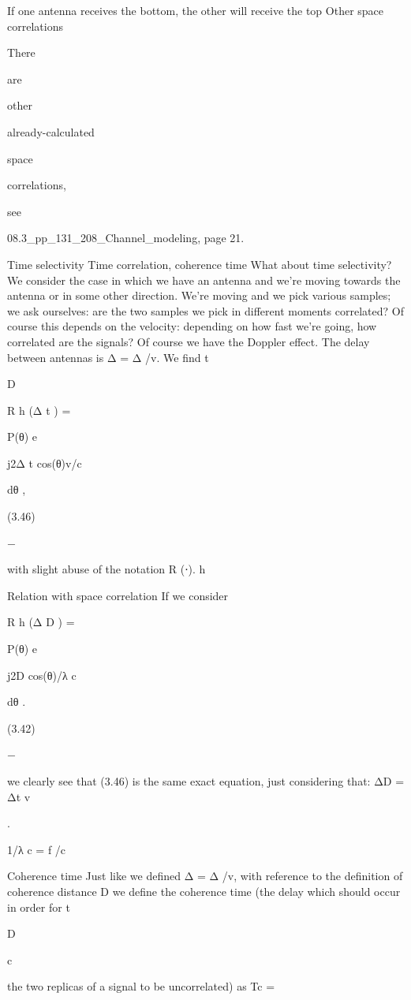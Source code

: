 {{{{If one antenna receives the bottom, the other will receive the top Other space correlations

There

are

other

already-calculated

space

correlations,

see

08.3_pp_131_208_Channel_modeling, page 21.

Time selectivity Time correlation, coherence time What about time selectivity? We consider the case in which we have an antenna and we're moving towards the antenna or in some other direction.
We're moving and we pick various samples; we ask ourselves: are the two samples we pick in different moments correlated? Of course this depends on the velocity: depending on how fast we're going, how correlated are the signals?
Of course we have the Doppler effect. The delay between antennas is Δ = Δ /v. We find t

D

\pi

R h (Δ t ) = \int

P(θ) e

j2\pif Δ t cos(θ)v/c

dθ ,

(3.46)

−\pi

with slight abuse of the notation R (⋅).
h

​Relation with space correlation If we consider
\pi

R h (Δ D ) = \int

P(θ) e

j2 D cos(θ)/λ c

dθ .

(3.42)

−\pi

we clearly see that (3.46) is the same exact equation, just considering that:
ΔD = Δt v

.

1/λ c = f /c

Coherence time Just like we defined Δ = Δ /v, with reference to the definition of coherence distance D we define the coherence time (the delay which should occur in order for t

D

c

the two replicas of a signal to be uncorrelated) as Tc =

}}}}
